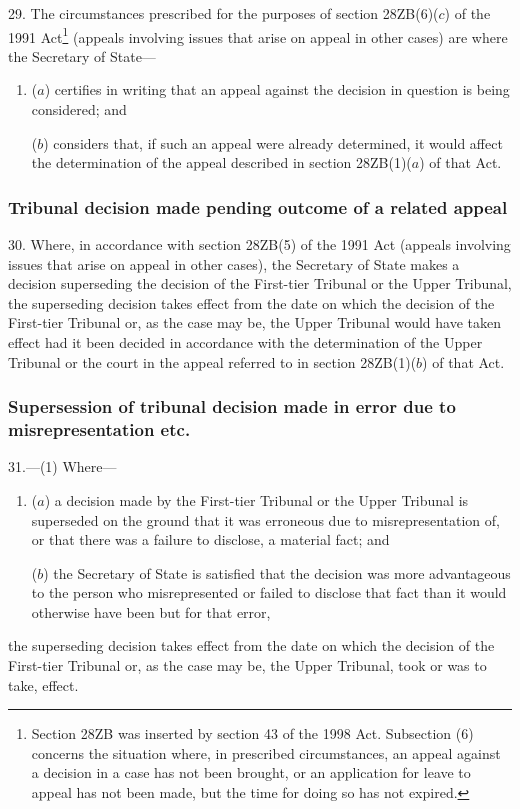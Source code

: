 \documentclass[12pt,a4paper]{article}
\begin{document}
29.  The circumstances prescribed for the purposes of section 28ZB(6)($c$)  of the 1991 Act\footnote{Section 28ZB was inserted by section 43 of the 1998 Act. Subsection (6) concerns the situation where, in prescribed circumstances, an appeal against a decision in a case has not been brought, or an application for leave to appeal has not been made, but the time for doing so has not expired.} (appeals involving issues that arise on appeal in other cases) are where the Secretary of State—
\begin{enumerate}\item[]
($a$) certifies in writing that an appeal against the decision in question is being considered; and

($b$) considers that, if such an appeal were already determined, it would affect the determination of the appeal described in section 28ZB(1)($a$)  of that Act.
\end{enumerate}

\subsubsection[30. Tribunal decision made pending outcome of a related appeal]{Tribunal decision made pending outcome of a related appeal}

30.  Where, in accordance with section 28ZB(5) of the 1991 Act (appeals involving issues that arise on appeal in other cases), the Secretary of State makes a decision superseding the decision of the First-tier Tribunal or the Upper Tribunal, the superseding decision takes effect from the date on which the decision of the First-tier Tribunal or, as the case may be, the Upper Tribunal would have taken effect had it been decided in accordance with the determination of the Upper Tribunal or the court in the appeal referred to in section 28ZB(1)($b$)  of that Act.

\subsubsection[31. Supersession of tribunal decision made in error due to misrepresentation etc.]{Supersession of tribunal decision made in error due to misrepresentation etc.}

31.---(1)  Where—
\begin{enumerate}\item[]
($a$) a decision made by the First-tier Tribunal or the Upper Tribunal is superseded on the ground that it was erroneous due to misrepresentation of, or that there was a failure to disclose, a material fact; and

($b$) the Secretary of State is satisfied that the decision was more advantageous to the person who misrepresented or failed to disclose that fact than it would otherwise have been but for that error,
\end{enumerate}
the superseding decision takes effect from the date on which the decision of the First-tier Tribunal or, as the case may be, the Upper Tribunal, took or was to take, effect.
\end{document}
